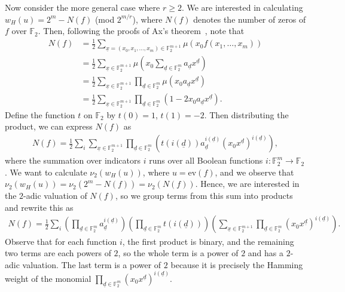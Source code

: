 \documentclass[twoside,romanappendices]{IEEEtran}
\newcommand{\vecnot}[1]{\underline{#1}}
\begin{document}
Now consider the more general case where $r \geq 2$.  
We are interested in calculating $w_H(u) = 2^m - N(f)$ (mod $2^{m/r}$), where $N(f)$ denotes the number of zeros of $f$ over $\mathbb{F}_2$. 
Then, following the proofs of Ax's theorem~\cite{Ax-ajm64, McEliece-dm72, Hou-actaa16}, note that
\begin{align} 
N(f) & = \frac{1}{2}\sum_{\vecnot{x} = (x_0,x_1,\ldots,x_m) \in \mathbb{F}_2^{m+1}} \mu(x_0 f(x_1,\ldots,x_m)) \\
     & = \frac{1}{2}\sum_{\vecnot{x} \in \mathbb{F}_2^{m+1}} \mu\left( x_0 \sum_{\vecnot{d} \in \mathbb{F}_2^m} a_{\vecnot{d}} x^{\vecnot{d}} \right) \\ 
     & = \frac{1}{2}\sum_{\vecnot{x} \in \mathbb{F}_2^{m+1}} \prod_{\vecnot{d} \in \mathbb{F}_2^m} \mu\left( x_0 a_{\vecnot{d}} x^{\vecnot{d}} \right) \\
     & = \frac{1}{2}\sum_{\vecnot{x} \in \mathbb{F}_2^{m+1}} \prod_{\vecnot{d} \in \mathbb{F}_2^m} \left( 1 - 2 x_0 a_{\vecnot{d}} x^{\vecnot{d}} \right).
\end{align}
Define the function $t$ on $\mathbb{F}_2$ by $t(0) = 1$, $t(1) = -2$.  
Then distributing the product, we can express $N(f)$ as 
\begin{align}
N(f) = \frac{1}{2}\sum_i \sum_{\vecnot{x} \in \mathbb{F}_2^{m+1}} \prod_{\vecnot{d} \in \mathbb{F}_2^m} \left( t(i(\vecnot{d})) a_{\vecnot{d}}^{i(\vecnot{d})}(x_0x^{\vecnot{d}})^{i(\vecnot{d})} \right),
\end{align}
where the summation over indicators $i$ runs over all Boolean functions $i \colon \mathbb{F}_2^m \rightarrow \mathbb{F}_2$. %
We want to calculate $\nu_2(w_H(u))$, where $u = \text{ev}(f)$, and we observe that $\nu_2(w_H(u)) = \nu_2(2^m - N(f)) = \nu_2(N(f))$.
Hence, we are interested in the $2$-adic valuation of $N(f)$, so we group terms from this sum into products and rewrite this as 
\begin{align}
N(f) = \frac{1}{2}\sum_i \left(\prod_{\vecnot{d} \in \mathbb{F}_2^m} a_{\vecnot{d}}^{i(\vecnot{d})} \right) \left(\prod_{\vecnot{d} \in \mathbb{F}_2^m} t(i(\vecnot{d})) \right) \left(\sum_{\vecnot{x} \in \mathbb{F}_2^{m+1}} \prod_{\vecnot{d} \in \mathbb{F}_2^m} \left( x_0 x^{\vecnot{d}} \right)^{i(\vecnot{d})}\right).
\end{align}
Observe that for each function $i$, the first product is binary, and the remaining two terms are each powers of $2$, so the whole term is a power of $2$ and has a $2$-adic valuation.
The last term is a power of $2$ because it is precisely the Hamming weight of the monomial $\prod_{\vecnot{d} \in \mathbb{F}_2^m} \left( x_0 x^{\vecnot{d}} \right)^{i(\vecnot{d})}$.
\end{document}
